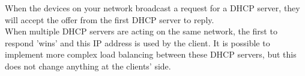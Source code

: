 When the devices on your network broadcast a request for a DHCP server, they will accept the offer from the first DHCP server to reply.\\
When multiple DHCP servers are acting on the same network, the first to respond 'wins' and this IP address is used by the client. It is possible to implement more complex load balancing between these DHCP servers, but this does not change anything at the clients' side.
